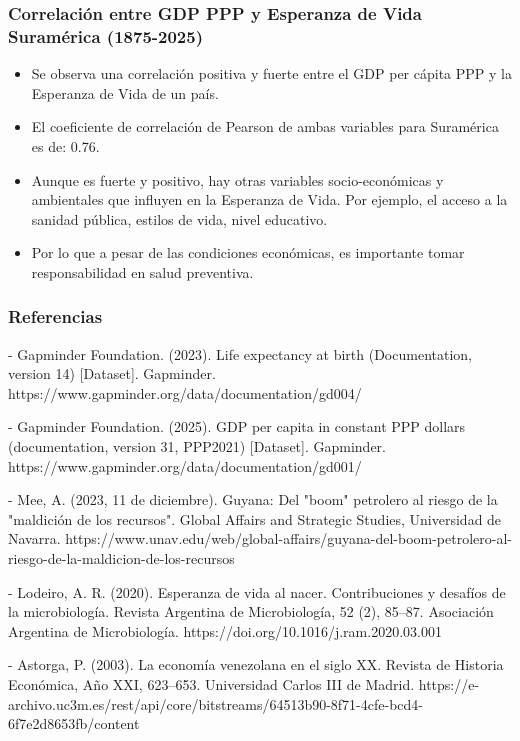 \documentclass{beamer}
\begin{document}
\begin{frame}[fragile]
\frametitle{Correlación entre GDP PPP y Esperanza de Vida Suramérica (1875-2025)}
\begin{itemize}
\item<1> Se observa una correlación positiva y fuerte entre el GDP per cápita PPP y la Esperanza de Vida de un país.

\item<2> El coeficiente de correlación de Pearson de ambas variables para Suramérica es de: 0.76.

\item<3> Aunque es fuerte y positivo, hay otras variables socio-económicas y ambientales que influyen en la Esperanza de Vida. Por ejemplo, el acceso a la sanidad pública, estilos de vida, nivel educativo.

\item<4> Por lo que a pesar de las condiciones económicas, es importante tomar responsabilidad en salud preventiva.
\end{itemize}
\end{frame}


\begin{frame}[fragile]
\frametitle{Referencias}
{\scriptsize
- Gapminder Foundation. (2023). Life expectancy at birth (Documentation, version 14) [Dataset]. Gapminder. https://www.gapminder.org/data/documentation/gd004/

- Gapminder Foundation. (2025). GDP per capita in constant PPP dollars (documentation, version 31, PPP2021) [Dataset]. Gapminder. https://www.gapminder.org/data/documentation/gd001/

- Mee, A. (2023, 11 de diciembre). Guyana: Del "boom" petrolero al riesgo de la "maldición de los recursos". Global Affairs and Strategic Studies, Universidad de Navarra. https://www.unav.edu/web/global-affairs/guyana-del-boom-petrolero-al-riesgo-de-la-maldicion-de-los-recursos

- Lodeiro, A. R. (2020). Esperanza de vida al nacer. Contribuciones y desafíos de la microbiología. Revista Argentina de Microbiología, 52 (2), 85–87. Asociación Argentina de Microbiología. https://doi.org/10.1016/j.ram.2020.03.001

- Astorga, P. (2003). La economía venezolana en el siglo XX. Revista de Historia Económica, Año XXI, 623–653. Universidad Carlos III de Madrid. https://e-archivo.uc3m.es/rest/api/core/bitstreams/64513b90-8f71-4cfe-bcd4-6f7e2d8653fb/content
}

\end{frame}
\end{document}
